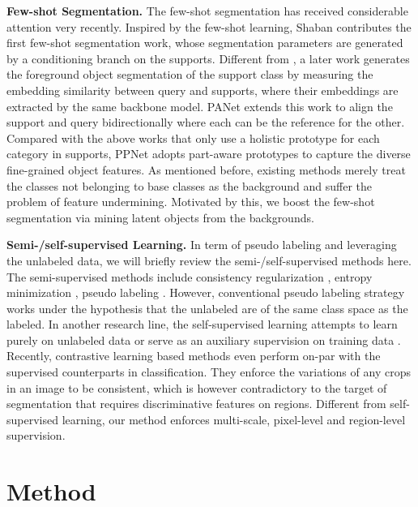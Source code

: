 \documentclass[10pt,twocolumn,letterpaper]{article}
\begin{document}
\textbf{Few-shot Segmentation.} 
The few-shot segmentation \cite{shaban2017one, zhang2018sg, wang2019panet, siam2019amp, tian2020differentiable, liu2020part, liu2020crnet, tian2020prior, boudiaf2020few, ouyang2020self, li2020fss, azad2021texture} has received considerable attention very recently. Inspired by the few-shot learning, Shaban \etal \cite{shaban2017one} contributes the first few-shot segmentation work, whose segmentation parameters are generated by a conditioning branch on the supports. Different from \cite{shaban2017one}, a later work \cite{zhang2018sg} generates the foreground object segmentation of the support class by measuring the embedding similarity between query and supports, where their embeddings are extracted by the same backbone model. PANet \cite{wang2019panet} extends this work to align the support and query bidirectionally where each can be the reference for the other. Compared with the above works that only use a holistic prototype for each category in supports, PPNet \cite{liu2020part} adopts part-aware prototypes to capture the diverse fine-grained object features. As mentioned before,  existing methods merely treat the classes not belonging to base classes as the background and suffer the problem of feature undermining. Motivated by this, we boost the few-shot segmentation via mining latent objects from the backgrounds.

\textbf{Semi-/self-supervised Learning.}
In term of pseudo labeling and leveraging the unlabeled data, we will briefly review the semi-/self-supervised methods here. The semi-supervised methods include consistency regularization \cite{tarvainen2017mean, berthelot2019mixmatch, sohn2020fixmatch, ouali2020semi}, entropy minimization \cite{grandvalet2005semi, saito2019semi}, pseudo labeling \cite{lee2013pseudo, Li_2020_CVPR} \etc. However, conventional pseudo labeling strategy works under the hypothesis that the unlabeled are of the same class space as the labeled. In another research line, the self-supervised learning attempts to learn purely on unlabeled data \cite{noroozi2016unsupervised, gidaris2018unsupervised} or serve as an auxiliary supervision on training data \cite{gidaris2019boosting, zhai2019s4l}.
Recently, contrastive learning based methods \cite{he2020momentum,chen2020simple} even perform on-par with the supervised counterparts in classification. They enforce the variations of any crops in an image to be consistent, which is however contradictory to the target of segmentation that requires discriminative features on regions. Different from self-supervised learning, our method enforces multi-scale, \ie pixel-level and region-level supervision.  \section{Method}
\label{method}
\end{document}
